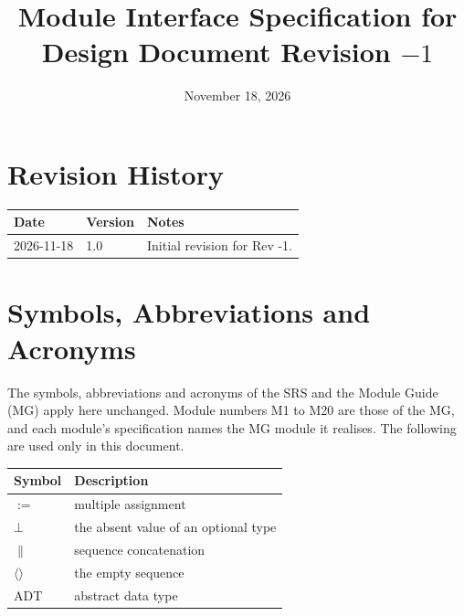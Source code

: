 \documentclass[12pt, titlepage]{article}
\newcommand{\nil}{\bot}
\begin{document}
\title{Module Interface Specification for \progname{}\\[4pt]
\large Design Document Revision $-1$}

\author{\authname}

\date{November 18, 2026}

\maketitle


\section{Revision History}

\begin{tabularx}{\textwidth}{p{3cm}p{2cm}X}
\toprule
\textbf{Date} & \textbf{Version} & \textbf{Notes}\\
\midrule
2026-11-18 & 1.0 & Initial revision for Rev -1.\\
\bottomrule
\end{tabularx}

\newpage

\tableofcontents

\newpage


\section{Symbols, Abbreviations and Acronyms}

The symbols, abbreviations and acronyms of the SRS and the Module Guide (MG)
apply here unchanged. Module numbers M1 to M20 are those of the MG, and each
module's specification names the MG module it realises. The following are used
only in this document.

\begin{tabular}{@{}p{2.2cm}p{11.5cm}@{}}
\toprule
\textbf{Symbol} & \textbf{Description}\\
\midrule
$:=$ & multiple assignment\\
$\nil$ & the absent value of an optional type\\
$\|$ & sequence concatenation\\
$\langle\rangle$ & the empty sequence\\
ADT & abstract data type\\
\bottomrule
\end{tabular}
\end{document}
